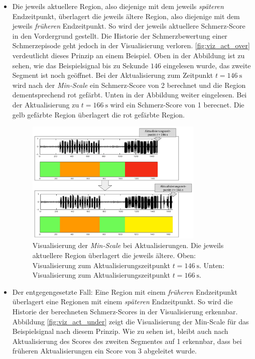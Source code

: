 \begin{itemize}
\item Die jeweils \glqq aktuellere\grqq{} Region, also diejenige mit dem jeweils \emph{späteren} Endzeitpunkt, überlagert die jeweils \glqq ältere\grqq{} Region, also diejenige mit dem jeweils \emph{früheren} Endzeitpunkt. So wird der jeweils aktuellere Schmerz-Score in den Vordergrund gestellt. Die Historie der Schmerzbewertung einer Schmerzepisode geht jedoch in der Visualisierung verloren. \autoref{fig:viz_act_over} verdeutlicht dieses Prinzip an einem Beispiel. Oben in der Abbildung ist zu sehen, wie das Beispielsignal bis zu Sekunde $146$ eingelesen wurde, das zweite Segment ist noch geöffnet. Bei der Aktualisierung zum Zeitpunkt $t=\SI{146}{\second}$ wird nach der \emph{Min-Scale} ein Schmerz-Score von 2 berechnet und die Region dementsprechend rot gefärbt. Unten in der Abbildung weiter eingelesen. Bei der Aktualisierung zu $t=\SI{166}{\second}$ wird ein Schmerz-Score von 1 berecnet. Die gelb gefärbte Region überlagert die rot gefärbte Region.

\begin{figure}[h]
	\centering
	\includegraphics[width=0.8\textwidth]{bilder/viz_act_over_03.png}
	\caption[Visualisierung der bei Aktualisierungen mit Priorisierung der aktuelleren Schmerzbewertung]{Visualisierung der \emph{Min-Scale} bei Aktualisierungen. Die jeweils \glqq aktuellere\grqq{} Region überlagert die jeweils \glqq ältere\grqq{}. Oben: Visualisierung zum Aktualisierungszeitpunkt $t=\SI{146}{\second}$. Unten: Visualisierung zum Aktualisierungszeitpunkt $t=\SI{166}{\second}$.}
	\label{fig:viz_act_over}
\end{figure}

\item Der entgegengesetzte Fall: Eine Region mit einem \emph{früheren} Endzeitpunkt überlagert eine Regionen mit einem \emph{späteren} Endzeitpunkt. So wird die Historie der berechneten Schmerz-Scores in der Visualisierung erkennbar. Abbildung \ref{fig:viz_act_under} zeigt die Visualisierung der Min-Scale für das Beispielsignal nach diesem Prinzip. Wie zu sehen ist, bleibt auch nach Aktualisierung des Scores des zweiten Segmentes auf 1 erkennbar, dass bei früheren Aktualisierungen ein Score von 3 abgeleitet wurde.


\end{itemize}
